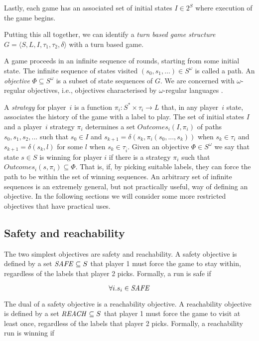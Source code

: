 Lastly, each game has an associated set of initial states $I \in 2^S$ where execution of the game begins.

Putting this all together, we can identify a \emph{turn based game structure} $G = \langle S,L,I,\tau_1,\tau_2,\delta \rangle$ with a turn based game.

A game proceeds in an infinite sequence of rounds, starting from some initial state. The infinite sequence of states visited $(s_0, s_1,\ldots) \in S^\omega$ is called a path. An \emph{objective} $\Phi \subseteq S^\omega$ is a subset of state sequences of $G$. We are concerned with $\omega$-regular objectives, i.e., objectives characterised by $\omega$-regular languages \cite{omega_reg_lang}. 

A \emph{strategy} for player~$i$ is a function $\pi_i : S^* \times \tau_i \rightarrow L$ that, in any player~$i$ state, associates the history of the game with a label to play. The set of initial states $I$ and a player~$i$ strategy $\pi_i$ determines a set $Outcomes_i(I, \pi_i)$ of paths $s_0, s_1, s_2, ...$ such that $s_0 \in I$ and $s_{k+1} = \delta(s_k, \pi_i(s_0,...,s_k))$ when $s_k \in \tau_i$ and $s_{k+1} = \delta(s_k, l)$ for some $l$ when $s_k \in \tau_{\overline{i}}$.  Given an objective $\Phi \in S^\omega$ we say that state $s \in S$ is winning for player $i$ if there is a strategy $\pi_i$ such that $Outcomes_i({s}, \pi_i) \subseteq \Phi$. That is, if, by picking suitable labels, they can force the path to be within the set of winning sequences. An arbitrary set of infinite sequences is an extremely general, but not practically useful, way of defining an objective. In the following sections we will consider some more restricted objectives that have practical uses.

\subsection{Safety and reachability}

The two simplest objectives are safety and reachability. A safety objective is defined by a set $\mathit{SAFE} \subseteq S$ that player 1 must force the game to stay within, regardless of the labels that player 2 picks. Formally, a run is safe if 

\begin{equation}
\label{eqn:safeobj}
\forall i. s_i \in \mathit{SAFE}
\end{equation}

The dual of a safety objective is a reachability objective. A reachability objective is defined by a set $\mathit{REACH} \subseteq S$ that player 1 must force the game to visit at least once, regardless of the labels that player 2 picks. Formally, a reachability run is winning if 

